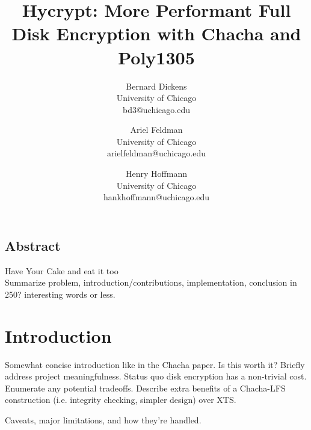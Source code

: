 \documentclass[letterpaper,twocolumn,10pt]{article}
\begin{document}
\date{}

\title{\Large \bf Hycrypt: More Performant Full Disk Encryption with Chacha and Poly1305}

\author{
{\rm Bernard Dickens}\\
University of Chicago\\
bd3@uchicago.edu
\and
{\rm Ariel Feldman}\\
University of Chicago\\
arielfeldman@uchicago.edu
\and
{\rm Henry Hoffmann}\\
University of Chicago\\
hankhoffmann@uchicago.edu
} %

\maketitle

\thispagestyle{empty}

\subsection*{Abstract}
Have Your Cake and eat it too \\
Summarize problem, introduction/contributions, implementation, conclusion in 250? interesting words or less.

\section{Introduction}
Somewhat concise introduction like in the Chacha paper. Is this worth it? Briefly address project meaningfulness.
Status quo disk encryption has a non-trivial cost. Enumerate any potential tradeoffs. Describe extra benefits of a
Chacha-LFS construction (i.e. integrity checking, simpler design) over XTS.

Caveats, major limitations, and how they're handled.
\end{document}
